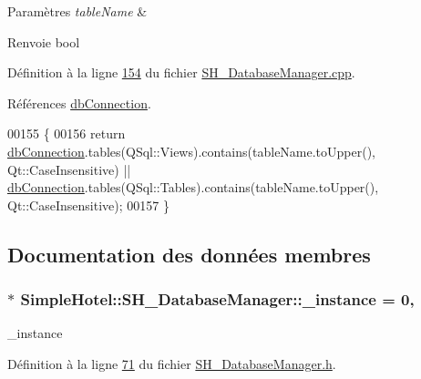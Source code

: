 \begin{DoxyParams}{Paramètres}
{\em table\-Name} & \\
\hline
\end{DoxyParams}
\begin{DoxyReturn}{Renvoie}
bool 
\end{DoxyReturn}


Définition à la ligne \hyperlink{SH__DatabaseManager_8cpp_source_l00154}{154} du fichier \hyperlink{SH__DatabaseManager_8cpp_source}{S\-H\-\_\-\-Database\-Manager.\-cpp}.



Références \hyperlink{classSimpleHotel_1_1SH__DatabaseManager_a01130ad218e0a00e80f53c4894996d19}{db\-Connection}.


\begin{DoxyCode}
00155 \{
00156     \textcolor{keywordflow}{return} \hyperlink{classSimpleHotel_1_1SH__DatabaseManager_a01130ad218e0a00e80f53c4894996d19}{dbConnection}.tables(QSql::Views).contains(tableName.toUpper(), Qt::CaseInsensitive) 
      || \hyperlink{classSimpleHotel_1_1SH__DatabaseManager_a01130ad218e0a00e80f53c4894996d19}{dbConnection}.tables(QSql::Tables).contains(tableName.toUpper(), Qt::CaseInsensitive);
00157 \}
\end{DoxyCode}


\subsection{Documentation des données membres}
\hypertarget{classSimpleHotel_1_1SH__DatabaseManager_af0c50165131f4999f3b18f44bb143567}{
\subsubsection[{\-\_\-instance}]{ $\ast$ Simple\-Hotel\-::\-S\-H\-\_\-\-Database\-Manager\-::\-\_\-instance = 0\hspace{0.3cm}{\ttfamily [static]}, {\ttfamily [private]}}}\label{classSimpleHotel_1_1SH__DatabaseManager_af0c50165131f4999f3b18f44bb143567}


\-\_\-instance 



Définition à la ligne \hyperlink{SH__DatabaseManager_8h_source_l00071}{71} du fichier \hyperlink{SH__DatabaseManager_8h_source}{S\-H\-\_\-\-Database\-Manager.\-h}.



